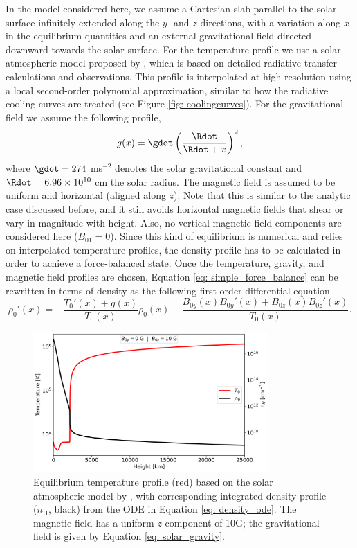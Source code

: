 In the model considered here, we assume a Cartesian slab parallel to the solar surface infinitely extended along the $y$- and $z$-directions, with a variation along $x$ in the equilibrium quantities and an external gravitational field directed downward towards the solar surface. For the temperature profile we use a solar atmospheric model proposed by \citet{avrett2008}, which is based on detailed radiative transfer calculations and observations. This profile is interpolated at high resolution using a local second-order polynomial approximation, similar to how the radiative cooling curves are treated (see Figure \ref{fig: coolingcurves}). For the gravitational field we assume the following profile,
\begin{equation} \label{eq: solar_gravity}
  g(x) = \gdot \left(\frac{\Rdot}{\Rdot + x}\right)^2,
\end{equation}
where $\gdot = 274$ ms$^{-2}$ denotes the solar gravitational constant and $\Rdot = 6.96 \times 10^{10}$ cm the solar radius. The magnetic field is assumed to be uniform and horizontal (aligned along $z$). Note that this is similar to the analytic case discussed before, and it still avoids horizontal magnetic fields that shear or vary in magnitude with height. Also, no vertical magnetic field components are considered here ($B_{01} = 0$). Since this kind of equilibrium is numerical and relies on interpolated temperature profiles, the density profile has to be calculated in order to achieve a force-balanced state. Once the temperature, gravity, and magnetic field profiles are chosen, Equation \eqref{eq: simple_force_balance} can be rewritten in terms of density as the following first order differential equation
\begin{equation} \label{eq: density_ode}
  \rho_0'(x) = -\frac{T_0'(x) + g(x)}{T_0(x)}\rho_0(x) - \frac{B_{0y}(x)B_{0y}'(x) + B_{0z}(x)B_{0z}'(x)}{T_0(x)}.
\end{equation}
\begin{figure}[t]
  \centering
  \includegraphics[width=0.8\textwidth]{profile.png}
  \caption{
    Equilibrium temperature profile (red) based on the solar atmospheric model by \citet{avrett2008}, with corresponding integrated density profile ($n_\text{H}$, black) from the ODE in Equation \eqref{eq: density_ode}. The magnetic field has a uniform $z$-component of 10G; the gravitational field is given by Equation
    \eqref{eq: solar_gravity}.
  }
  \label{fig: temperature-density-profile}
\end{figure}
